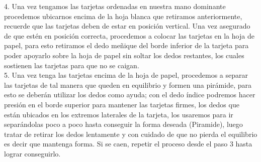 \documentclass{article}
\begin{document}
4.	Una vez tengamos las tarjetas ordenadas en nuestra mano dominante procedemos ubicarnos encima de la hoja blanca que retiramos anteriormente, recuerde que las tarjetas deben de estar en posición vertical. Una vez asegurado de que estén en posición correcta, procedemos a colocar las tarjetas en la hoja de papel, para esto retiramos el dedo meñique del borde inferior de la tarjeta para poder  apoyarlo sobre la hoja de papel sin soltar los  dedos restantes, los cuales sostienen las tarjetas para que no se caigan.\\ 


5.	Una vez tenga las tarjetas encima de la hoja de papel, procedemos a separar las tarjetas de tal manera que queden en equilibrio y formen una pirámide,  para esto se deberán utilizar los dedos como ayuda; con el dedo índice podremos hacer presión en el borde superior  para mantener las tarjetas firmes, los dedos que están ubicados en los extremos laterales de la tarjeta, los usaremos para ir separándolas poco a poco hasta conseguir la forma deseada (Piramide), luego tratar de retirar los dedos lentamente y con cuidado de que no pierda el equilibrio es decir que mantenga forma. Si se caen, repetir el proceso desde el paso 3 hasta lograr conseguirlo. 
\end{document}
